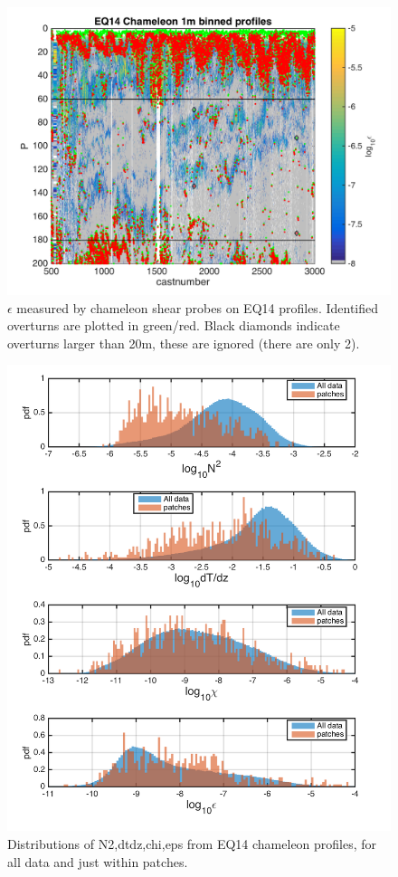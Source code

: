 \documentclass[11pt]{article}
\begin{document}
\begin{figure}[htbp]
\includegraphics[scale=0.8]{GamByPatch_eps_pcolor_wpatches.png}
\caption{$\epsilon$ measured by chameleon shear probes on EQ14 profiles. Identified overturns are plotted in green/red. Black diamonds indicate overturns larger than 20m, these are ignored (there are only 2).}
\label{epswot}
\end{figure}


\begin{figure}[htbp]
\includegraphics[scale=0.8]{hists_allVspatch.png}
\caption{Distributions of N2,dtdz,chi,eps from EQ14 chameleon profiles, for all data and just within patches.}
\label{hists_allVspatch}
\end{figure}
\end{document}
